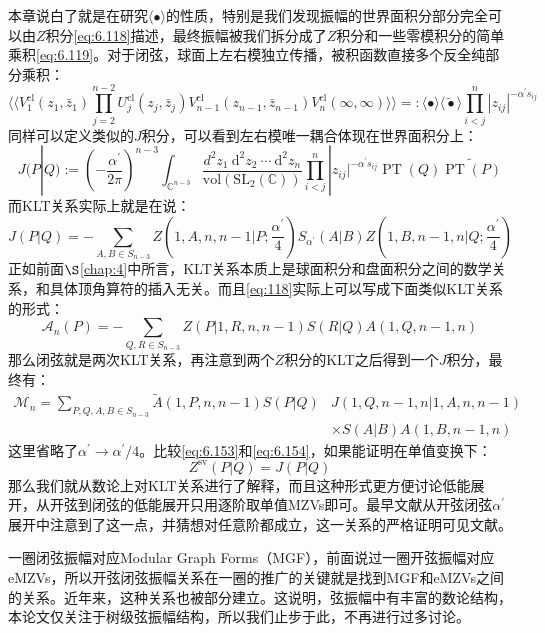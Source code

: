 本章说白了就是在研究$\langle\bullet\rangle$的性质，特别是我们发现振幅的世界面积分部分完全可以由$Z$积分\ref{eq:6.118}描述，最终振幅被我们拆分成了$Z$积分和一些零模积分的简单乘积\ref{eq:6.119}。对于闭弦，球面上左右模独立传播，被积函数直接多个反全纯部分乘积：
\begin{equation}
		\langle\langle V_1^{\mathrm{cl}}(z_1,\bar z_1)\prod_{j=2}^{n-2}U_j^{\mathrm{cl}}(z_j,\bar z_j)V_{n-1}^{\mathrm{cl}}(z_{n-1},\bar z_{n-1})V_n^{\mathrm{cl}}(\infty,\infty)\rangle\rangle=:\langle\bullet\rangle\langle\widetilde\bullet\rangle\prod_{i<j}^n|z_{ij}|^{-\alpha^{\prime}s_{ij}}
\end{equation}
同样可以定义类似的$J$积分，可以看到左右模唯一耦合体现在世界面积分上：
\begin{equation}
	J(P|Q):=\left(-\frac{\alpha^{\prime}}{2\pi}\right)^{n-3}\int_{\mathbb{C}^{n-3}}\frac{d^2z_1\mathrm{~d}^2z_2\mathrm{~\cdots~d}^2z_n}{\mathrm{vol}(\mathrm{SL}_2(\mathbb{C}))}\prod_{i<j}^n|z_{ij}|^{-\alpha^{\prime}s_{ij}}\operatorname{PT}(Q)\widetilde{\operatorname{PT}(P)}
\end{equation}
而KLT关系实际上就是在说：
\begin{equation}
	J(P|Q)=-\sum_{A,B\in S_{n-3}}Z(1,A,n,n-1|P;\frac{\alpha^\prime}{4})S_{\alpha^{\prime}}(A|B)Z(1,B,n-1,n|Q;\frac{\alpha^\prime}{4})
\end{equation}
正如前面$\S$\ref{chap:4}中所言，KLT关系本质上是球面积分和盘面积分之间的数学关系，和具体顶角算符的插入无关。而且\ref{eq:118}实际上可以写成下面类似KLT关系的形式：\cite{Broedel:2013tta}
\begin{equation}
	\label{eq:6.153}
	\mathcal{A}_n(P)=-\sum_{Q,R\in S_{n-3}}Z(P|1,R,n,n-1)S(R|Q)A(1,Q,n-1,n)
\end{equation}
那么闭弦就是两次KLT关系，再注意到两个$Z$积分的KLT之后得到一个$J$积分，最终有：
\begin{equation}
	\label{eq:6.154}
\begin{aligned}
		\mathcal{M}_{n}=\sum_{P,Q,A,B\in S_{n-3}}\tilde{A}(1,P,n,n-1)S(P|Q)&J(1,Q,n-1,n|1,A,n,n-1)
	\\&\times S(A|B)A(1,B,n-1,n)
\end{aligned}
\end{equation}
这里省略了$\alpha^\prime\to\alpha^\prime/4$。比较\ref{eq:6.153}和\ref{eq:6.154}，如果能证明在单值变换下：
\begin{equation}
	Z^\mathrm{sv}(P|Q) = J(P|Q)
\end{equation}
那么我们就从数论上对KLT关系进行了解释，而且这种形式更方便讨论低能展开，从开弦到闭弦的低能展开只用逐阶取单值MZVs即可。最早文献\cite{Schlotterer:2012ny,Stieberger:2013wea,Stieberger:2014hba}从开弦闭弦$\alpha^\prime$展开中注意到了这一点，并猜想对任意阶都成立，这一关系的严格证明可见文献\cite{Schlotterer:2018zce,Brown:2018omk,Brown:2019wna}。

一圈闭弦振幅对应Modular Graph Forms（MGF）\cite{Gerken:2020xfv}，前面说过一圈开弦振幅对应eMZVs，所以开弦闭弦振幅关系在一圈的推广的关键就是找到MGF和eMZVs之间的关系。近年来，这种关系也被部分建立\cite{Zerbini:2015rss,Broedel:2018izr,Zagier:2019eus,Gerken:2020xfv}。这说明，弦振幅中有丰富的数论结构，本论文仅关注于树级弦振幅结构，所以我们止步于此，不再进行过多讨论。


